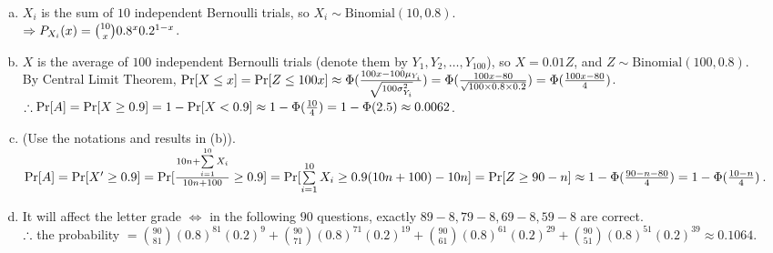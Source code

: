 \begin{pr}$ $
\begin{enumerate}[(a)]
\item $X_i$ is the sum of $10$ independent Bernoulli trials, so $X_i\sim\mathrm{Binomial}(10, 0.8)$.\\
$\then P_{X_i}(x)=\binom{10}x0.8^x0.2^{1-x}$.
\item $X$ is the average of $100$ independent Bernoulli trials (denote them by $Y_1, Y_2, \dots, Y_{100}$), so $X=0.01Z$, and $Z\sim\mathrm{Binomial}(100, 0.8)$.\\
By Central Limit Theorem, $\P[X\leq x]=\P[Z\leq100x]\approx\Phi(\frac{100x-100\mu_{Y_i}}{\sqrt{100\sigma_{Y_i}^2}})=\Phi(\frac{100x-80}{\sqrt{100\times0.8\times0.2}})=\Phi(\frac{100x-80}4)$.\\
$\so\P[A]=\P[X\geq0.9]=1-\P[X<0.9]\approx1-\Phi(\frac{10}4)=1-\Phi(2.5)\approx0.0062$.
\item (Use the notations and results in (b)).\\
$\P[A]=\P[X'\geq0.9]=\P[\frac{10n+\suml_{i=1}^{10}X_i}{10n+100}\geq0.9]=\P[\suml_{i=1}^{10}X_i\geq0.9(10n+100)-10n]=\P[Z\geq90-n]\approx1-\Phi(\frac{90-n-80}4)=1-\Phi(\frac{10-n}4)$.
\item It will affect the letter grade $\iff$ in the following $90$ questions, exactly $89-8, 79-8, 69-8, 59-8$ are correct.\\
$\so$ the probability $=\binom{90}{81}(0.8)^{81}(0.2)^9+\binom{90}{71}(0.8)^{71}(0.2)^{19}+\binom{90}{61}(0.8)^{61}(0.2)^{29}+\binom{90}{51}(0.8)^{51}(0.2)^{39}\approx0.1064$.
\end{enumerate}
\end{pr}
